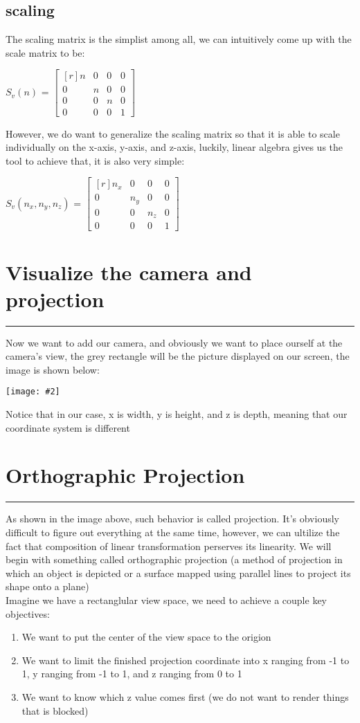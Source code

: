 \documentclass[11pt]{article}
\newcommand{\image}[2]{\texttt{[image: \#2]}}
\newcommand{\mysection}[1]{
    \section*{#1}
    \hrule
    \vspace*{0.5cm}
}
\newcommand{\mat}[1]{
    $\begin{bmatrix*}[r]
        #1
    \end{bmatrix*}$
} %
\newcommand{\gap}{\vspace*{0.5cm}}
\begin{document}
\subsection{scaling}
The scaling matrix is the simplist among all, we can intuitively come up with the scale matrix to be: \\
\begin{center}
    $S_v(n)$ = \mat{
    n & 0 & 0 & 0 \\
    0 & n & 0 & 0 \\
    0 & 0 & n & 0 \\
    0 & 0 & 0 & 1
}
\end{center}
However, we do want to generalize the scaling matrix so that it is able to scale individually on the x-axis, y-axis, and z-axis, luckily, linear algebra gives us the tool to achieve that, it is also very simple:
\begin{center}
    $S_v(n_x, n_y, n_z)$ = \mat{
    n_x & 0 & 0 & 0 \\
    0 & n_y & 0 & 0 \\
    0 & 0 & n_z & 0 \\
    0 & 0 & 0 & 1
}
\end{center}
\mysection{Visualize the camera and projection}
Now we want to add our camera, and obviously we want to place ourself at the camera's view, the grey rectangle will be the picture displayed on our screen, the image is shown below:
\begin{center}
    \image{0.5}{view}{}
\end{center}
Notice that in our case, x is width, y is height, and z is depth, meaning that our coordinate system is different
\mysection{Orthographic Projection}
As shown in the image above, such behavior is called projection. It's obviously difficult to figure out everything at the same time, however, we can ultilize the fact that composition of linear transformation perserves its linearity. We will begin with something called orthographic projection (a method of projection in which an object is depicted or a surface mapped using parallel lines to project its shape onto a plane) \gap \\
Imagine we have a rectanglular view space, we need to achieve a couple key objectives:
\begin{enumerate}
    \item We want to put the center of the view space to the origion
    \item We want to limit the finished projection coordinate into x ranging from -1 to 1, y ranging from -1 to 1, and z ranging from 0 to 1
    \item We want to know which z value comes first (we do not want to render things that is blocked)
\end{enumerate}
\end{document}
